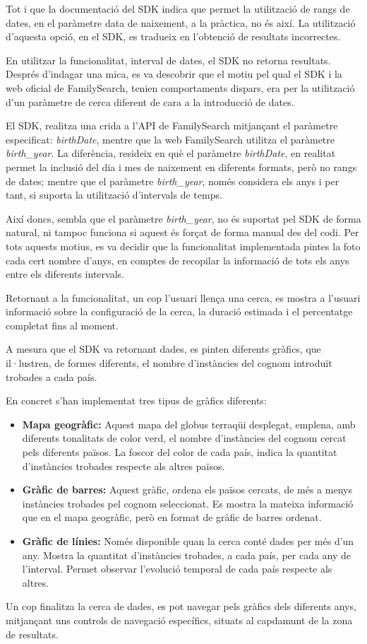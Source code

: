     Tot i que la documentació del SDK indica que permet la utilització de rangs de dates, en el paràmetre data de naixement, a la pràctica, no és així. La utilització d'aquesta opció, en el SDK, es tradueix en l’obtenció de resultats incorrectes.

    En utilitzar la funcionalitat, interval de dates, el SDK no retorna resultats. Després d'indagar una mica, es va descobrir que el motiu pel qual el SDK i la web oficial de FamilySearch, tenien comportaments dispars, era per la utilització d’un paràmetre de cerca diferent de cara a la introducció de dates.

    El SDK, realitza una crida a l'API de FamilySearch mitjançant el paràmetre especificat: \emph{birthDate}, mentre que la web FamilySearch utilitza el paràmetre \emph{birth\_year}. La diferència, resideix en què el paràmetre \emph{birthDate}, en realitat permet la inclusió del dia i mes de naixement en diferents formats, però no rangs de dates; mentre que el paràmetre \emph{birth\_year}, només considera els anys i per tant, si suporta la utilització d’intervals de temps.

    Així doncs, sembla que el paràmetre \emph{birth\_year}, no és suportat pel SDK de forma natural, ni tampoc funciona si aquest és forçat de forma manual des del codi. Per tots aquests motius, es va decidir que la funcionalitat implementada pintes la foto cada cert nombre d'anys, en comptes de recopilar la informació de tots els anys entre els diferents intervals.

    Retornant a la funcionalitat, un cop l’usuari llença una cerca, es mostra a l'usuari informació sobre la configuració de la cerca, la duració estimada i el percentatge completat fins al moment.

    A mesura que el SDK va retornant dades, es pinten diferents gràfics, que il·lustren, de formes diferents, el nombre d'instàncies del cognom introduït trobades a cada país.

    En concret s’han implementat tres tipus de gràfics diferents:

    \begin{itemize}
        \item \textbf{Mapa geogràfic:} Aquest mapa del globus terraqüi desplegat, emplena, amb diferents tonalitats de color verd, el nombre d’instàncies del cognom cercat pels diferents països. La foscor del color de cada país, indica la quantitat d'instàncies trobades respecte als altres països.
        \item \textbf{Gràfic de barres:} Aquest gràfic, ordena els països cercats, de més a menys instàncies trobades pel cognom seleccionat. Es mostra la mateixa informació que en el mapa geogràfic, però en format de gràfic de barres ordenat.
        \item \textbf{Gràfic de línies:} Només disponible quan la cerca conté dades per més d'un any. Mostra la quantitat d'instàncies trobades, a cada país, per cada any de l’interval. Permet observar l'evolució temporal de cada país respecte als altres.
    \end{itemize}

    Un cop finalitza la cerca de dades, es pot navegar pels gràfics dels diferents anys, mitjançant uns controls de navegació específics, situats al capdamunt de la zona de resultats.

